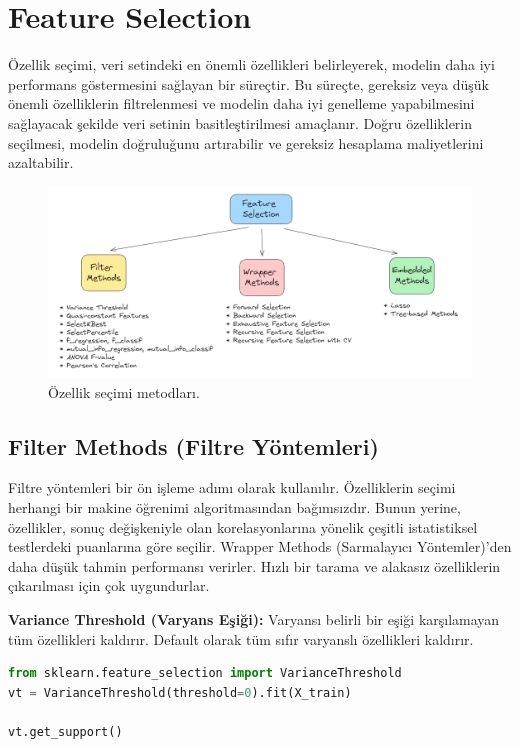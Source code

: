 \section{Feature Selection}
Özellik seçimi, veri setindeki en önemli özellikleri belirleyerek, modelin daha iyi performans göstermesini sağlayan bir süreçtir. Bu süreçte, gereksiz veya düşük önemli özelliklerin filtrelenmesi ve modelin daha iyi genelleme yapabilmesini sağlayacak şekilde veri setinin basitleştirilmesi amaçlanır. Doğru özelliklerin seçilmesi, modelin doğruluğunu artırabilir ve gereksiz hesaplama maliyetlerini azaltabilir.

\begin{figure}[h]
    \centering
    \includegraphics[width=1\textwidth]{images/feature_selection_methods.png}
    \caption{Özellik seçimi metodları.}
    \label{fig:enter-label}
\end{figure}

\newpage

\subsection{Filter Methods (Filtre Yöntemleri)}
Filtre yöntemleri bir ön işleme adımı olarak kullanılır. Özelliklerin seçimi herhangi bir makine öğrenimi algoritmasından bağımsızdır. Bunun yerine, özellikler, sonuç değişkeniyle olan korelasyonlarına yönelik çeşitli istatistiksel testlerdeki puanlarına göre seçilir. Wrapper Methods (Sarmalayıcı Yöntemler)'den daha düşük tahmin performansı verirler. Hızlı bir tarama ve alakasız özelliklerin çıkarılması için çok uygundurlar.

\textbf{Variance Threshold (Varyans Eşiği):} Varyansı belirli bir eşiği karşılamayan tüm özellikleri kaldırır. Default olarak tüm sıfır varyanslı özellikleri kaldırır.

\begin{lstlisting}[language=Python]
from sklearn.feature_selection import VarianceThreshold
vt = VarianceThreshold(threshold=0).fit(X_train)

vt.get_support()
\end{lstlisting}

